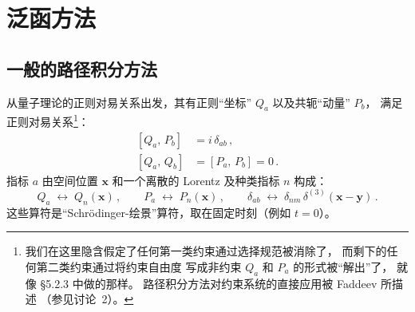 
\section{泛函方法}
\subsection{一般的路径积分方法}
从量子理论的正则对易关系出发，其有正则``坐标'' $Q_a$ 以及共轭``动量'' $P_b$，
满足正则对易关系\footnote{%
  我们在这里隐含假定了任何第一类约束通过选择规范被消除了，
  而剩下的任何第二类约束通过将约束自由度
  写成非约束 $Q_a$ 和 $P_a$ 的形式被``解出''了，
  就像 \S5.2.3 中做的那样。
  路径积分方法对约束系统的直接应用被 Faddeev 所描述
  （参见讨论~2）。}：
\begin{subequations}\label{eq:CCR-gen}
\begin{align}
  [Q_a,\,P_b] &= i\,\delta_{ab}\,,\label{eq:QP}\\
  [Q_a,\,Q_b] &= [P_a,\,P_b] = 0\,.\label{eq:QQ-PP}
\end{align}
\end{subequations}
指标 $a$ 由空间位置 $\mathbf{x}$
和一个离散的 Lorentz 及种类指标 $n$ 构成：
\begin{equation}\label{eq:field-index}
  Q_a \;\longleftrightarrow\; Q_n(\mathbf{x})\,,\qquad
  P_a \;\longleftrightarrow\; P_n(\mathbf{x})\,,\qquad
  \delta_{ab} \;\longleftrightarrow\;
    \delta_{nm}\,\delta^{(3)}(\mathbf{x}-\mathbf{y})\,.
\end{equation}
这些算符是``Schr\"odinger-绘景''算符，取在固定时刻（例如 $t=0$）。
\medskip


